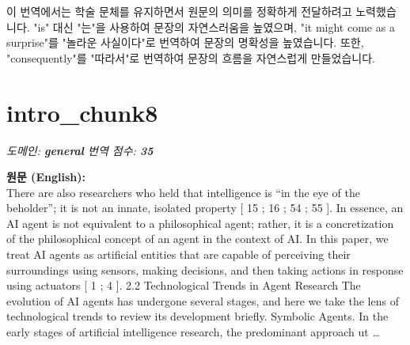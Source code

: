 \documentclass[12pt,a4paper]{article}
\begin{document}
\begin{mdframed}[style=ko]
이 번역에서는 학술 문체를 유지하면서 원문의 의미를 정확하게 전달하려고 노력했습니다. "is" 대신 "는"을 사용하여 문장의 자연스러움을 높였으며, "it might come as a surprise"를 "놀라운 사실이다"로 번역하여 문장의 명확성을 높였습니다. 또한, "consequently"를 "따라서"로 번역하여 문장의 흐름을 자연스럽게 만들었습니다.


\end{mdframed}
\vspace{1em}

\section{intro\_chunk8}
\noindent\textit{\small 도메인: \textbf{general} \quad 번역 점수: \textbf{\color{red!70!black}35}}
\vspace{0.5em}

\begin{mdframed}[style=orig]
\noindent\textbf{\small 원문 (English):}\\[2pt]
\small There are also researchers who held that intelligence is “in the eye of the beholder”; it is not an innate, isolated property [ 15 ; 16 ; 54 ; 55 ]. In essence, an AI agent is not equivalent to a philosophical agent; rather, it is a concretization of the philosophical concept of an agent in the context of AI. In this paper, we treat AI agents as artificial entities that are capable of perceiving their surroundings using sensors, making decisions, and then taking actions in response using actuators [ 1 ; 4 ]. 2.2 Technological Trends in Agent Research The evolution of AI agents has undergone several stages, and here we take the lens of technological trends to review its development briefly. Symbolic Agents. In the early stages of artificial intelligence research, the predominant approach ut \ldots
\end{mdframed}
\vspace{0.4em}
\end{document}
